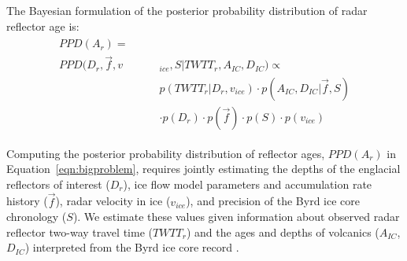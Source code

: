 The Bayesian formulation of the posterior probability distribution of radar reflector age is:
\begin{equation}\label{eqn:bigproblem}
\begin{split} %
\begin{aligned}
PPD(A_r)  =~~~~~~~~~   &\\
PPD(D_r,\vec{f},v&_{ice},S | TWTT_r,A_{IC},D_{IC})  \propto  \\
&p(TWTT_r | D_r,v_{ice}) \cdot p(A_{IC},D_{IC} | \vec{f},S)  \\ 
& \cdot p(D_r) \cdot p(\vec{f}) \cdot p(S) \cdot p(v_{ice}) 
\end{aligned}
\end{split}
\end{equation}

Computing the posterior probability distribution of reflector ages, $PPD(A_r)$ in Equation~\ref{eqn:bigproblem}, requires jointly estimating the depths of the englacial reflectors of interest ($D_r$), ice flow model parameters and accumulation rate history ($\vec{f}$), radar velocity in ice ($v_{ice}$), and precision of the Byrd ice core chronology ($S$). We estimate these values given information about observed radar reflector two-way travel time ($TWTT_r$) and the ages and depths of volcanics ($A_{IC}$, $D_{IC}$) interpreted from the Byrd ice core record \citep{hammer1997}.


